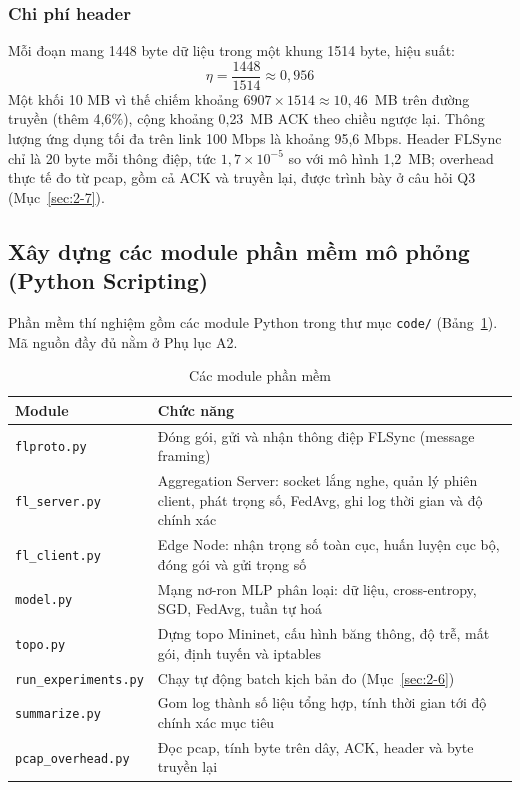\subsubsection{Chi phí header}
Mỗi đoạn mang 1448 byte dữ liệu trong một khung 1514 byte, hiệu suất:
\begin{equation}
    \eta = \frac{1448}{1514} \approx 0{,}956
    \label{eq:eta}
\end{equation}
Một khối 10 MB vì thế chiếm khoảng $6907 \times 1514 \approx 10{,}46$~MB trên đường truyền (thêm 4{,}6\%), cộng khoảng 0{,}23~MB ACK theo chiều ngược lại. Thông lượng ứng dụng tối đa trên link 100 Mbps là khoảng 95{,}6 Mbps. Header FLSync chỉ là 20 byte mỗi thông điệp, tức $1{,}7 \times 10^{-5}$ so với mô hình 1{,}2~MB; overhead thực tế đo từ pcap, gồm cả ACK và truyền lại, được trình bày ở câu hỏi Q3 (Mục~\ref{sec:2-7}).

\subsection{Xây dựng các module phần mềm mô phỏng (Python Scripting)}
\label{sec:2-5}
Phần mềm thí nghiệm gồm các module Python trong thư mục \texttt{code/} (Bảng~\ref{tab:modules}). Mã nguồn đầy đủ nằm ở Phụ lục A2.

\begin{table}[H]
    \centering
    \caption{Các module phần mềm}
    \label{tab:modules}
    \begin{tabularx}{\textwidth}{>{\raggedright\arraybackslash}p{4.5cm} >{\raggedright\arraybackslash}X}
        \toprule
        \textbf{Module} & \textbf{Chức năng} \\
        \midrule
        \texttt{flproto.py} & Đóng gói, gửi và nhận thông điệp FLSync (message framing) \\
        \texttt{fl\_server.py} & Aggregation Server: socket lắng nghe, quản lý phiên client, phát trọng số, FedAvg, ghi log thời gian và độ chính xác \\
        \texttt{fl\_client.py} & Edge Node: nhận trọng số toàn cục, huấn luyện cục bộ, đóng gói và gửi trọng số \\
        \texttt{model.py} & Mạng nơ-ron MLP phân loại: dữ liệu, cross-entropy, SGD, FedAvg, tuần tự hoá \\
        \texttt{topo.py} & Dựng topo Mininet, cấu hình băng thông, độ trễ, mất gói, định tuyến và iptables \\
        \texttt{run\_experiments.py} & Chạy tự động batch kịch bản đo (Mục~\ref{sec:2-6}) \\
        \texttt{summarize.py} & Gom log thành số liệu tổng hợp, tính thời gian tới độ chính xác mục tiêu \\
        \texttt{pcap\_overhead.py} & Đọc pcap, tính byte trên dây, ACK, header và byte truyền lại \\
        \bottomrule
    \end{tabularx}
\end{table}

